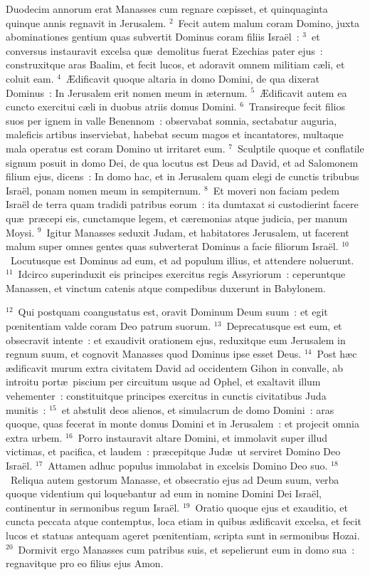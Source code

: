 \bchapter
\lettrine[lines=3,image=true,loversize=0.05,lraise=-0.03]{D}{}uodecim annorum erat Manasses cum regnare cœpisset, et quinquaginta quinque annis regnavit in Jerusalem.
${}^{2}$~Fecit autem malum coram Domino, juxta abominationes gentium quas subvertit Dominus coram filiis Isra\"el~:
${}^{3}$~et conversus instauravit excelsa qu\ae\ demolitus fuerat Ezechias pater ejus~: construxitque aras Baalim, et fecit lucos, et adoravit omnem militiam c\ae li, et coluit eam.
${}^{4}$~\AE dificavit quoque altaria in domo Domini, de qua dixerat Dominus~: In Jerusalem erit nomen meum in \ae ternum.
${}^{5}$~\AE dificavit autem ea cuncto exercitui c\ae li in duobus atriis domus Domini.
${}^{6}$~Transireque fecit filios suos per ignem in valle Benennom~: observabat somnia, sectabatur auguria, maleficis artibus inserviebat, habebat secum magos et incantatores, multaque mala operatus est coram Domino ut irritaret eum.
${}^{7}$~Sculptile quoque et conflatile signum posuit in domo Dei, de qua locutus est Deus ad David, et ad Salomonem filium ejus, dicens~: In domo hac, et in Jerusalem quam elegi de cunctis tribubus Isra\"el, ponam nomen meum in sempiternum.
${}^{8}$~Et moveri non faciam pedem Isra\"el de terra quam tradidi patribus eorum~: ita dumtaxat si custodierint facere qu\ae\ pr\ae cepi eis, cunctamque legem, et c\ae remonias atque judicia, per manum Moysi.
${}^{9}$~Igitur Manasses seduxit Judam, et habitatores Jerusalem, ut facerent malum super omnes gentes quas subverterat Dominus a facie filiorum Isra\"el.
${}^{10}$~Locutusque est Dominus ad eum, et ad populum illius, et attendere noluerunt.
${}^{11}$~Idcirco superinduxit eis principes exercitus regis Assyriorum~: ceperuntque Manassen, et vinctum catenis atque compedibus duxerunt in Babylonem.


${}^{12}$~Qui postquam coangustatus est, oravit Dominum Deum suum~: et egit pœnitentiam valde coram Deo patrum suorum.
${}^{13}$~Deprecatusque est eum, et obsecravit intente~: et exaudivit orationem ejus, reduxitque eum Jerusalem in regnum suum, et cognovit Manasses quod Dominus ipse esset Deus.
${}^{14}$~Post h\ae c \ae dificavit murum extra civitatem David ad occidentem Gihon in convalle, ab introitu port\ae\ piscium per circuitum usque ad Ophel, et exaltavit illum vehementer~: constituitque principes exercitus in cunctis civitatibus Juda munitis~:
${}^{15}$~et abstulit deos alienos, et simulacrum de domo Domini~: aras quoque, quas fecerat in monte domus Domini et in Jerusalem~: et projecit omnia extra urbem.
${}^{16}$~Porro instauravit altare Domini, et immolavit super illud victimas, et pacifica, et laudem~: pr\ae cepitque Jud\ae\ ut serviret Domino Deo Isra\"el.
${}^{17}$~Attamen adhuc populus immolabat in excelsis Domino Deo suo.
${}^{18}$~Reliqua autem gestorum Manasse, et obsecratio ejus ad Deum suum, verba quoque videntium qui loquebantur ad eum in nomine Domini Dei Isra\"el, continentur in sermonibus regum Isra\"el.
${}^{19}$~Oratio quoque ejus et exauditio, et cuncta peccata atque contemptus, loca etiam in quibus \ae dificavit excelsa, et fecit lucos et statuas antequam ageret pœnitentiam, scripta sunt in sermonibus Hozai.
${}^{20}$~Dormivit ergo Manasses cum patribus suis, et sepelierunt eum in domo sua~: regnavitque pro eo filius ejus Amon.


